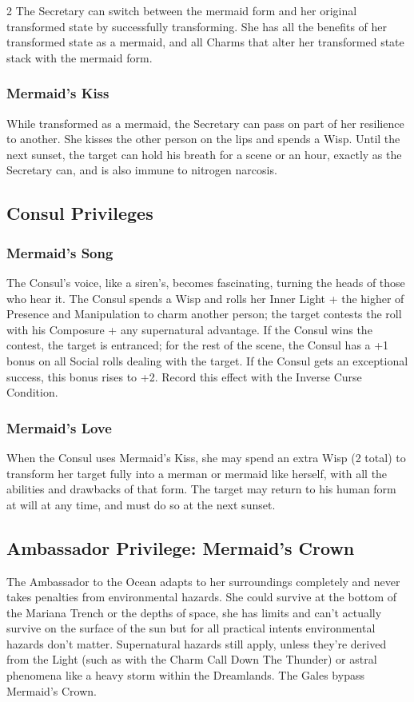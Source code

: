 \begin{multicols}{2}
The Secretary can switch between the mermaid form and her original transformed state by successfully transforming. She has all the benefits of her transformed state as a mermaid, and all Charms that alter her transformed state stack with the mermaid form. 
\subsubsection*{Mermaid's Kiss}
While transformed as a mermaid, the Secretary can pass on part of her resilience to another. She kisses the other person on the lips and spends a Wisp. Until the next sunset, the target can hold his breath for a scene or an hour, exactly as the Secretary can, and is also immune to nitrogen narcosis. 
\subsection*{Consul Privileges}

\subsubsection*{Mermaid's Song}
The Consul's voice, like a siren's, becomes fascinating, turning the heads of those who hear it. The Consul spends a Wisp and rolls her Inner Light + the higher of Presence and Manipulation to charm another person; the target contests the roll with his Composure + any supernatural advantage. If the Consul wins the contest, the target is entranced; for the rest of the scene, the Consul has a +1 bonus on all Social rolls dealing with the target. If the Consul gets an exceptional success, this bonus rises to +2. Record this effect with the Inverse Curse Condition.
\subsubsection*{Mermaid's Love}
When the Consul uses Mermaid's Kiss, she may spend an extra Wisp (2 total) to transform her target fully into a merman or mermaid like herself, with all the abilities and drawbacks of that form. The target may return to his human form at will at any time, and must do so at the next sunset. 
\subsection*{Ambassador Privilege: Mermaid's Crown}
The Ambassador to the Ocean adapts to her surroundings completely and never takes penalties from environmental hazards. She could survive at the bottom of the Mariana Trench or the depths of space, she has limits and can't actually survive on the surface of the sun but for all practical intents environmental hazards don't matter. Supernatural hazards still apply, unless they're derived from the Light (such as with the Charm Call Down The Thunder) or astral phenomena like a heavy storm within the Dreamlands. The Gales bypass Mermaid's Crown.


\end{multicols}
